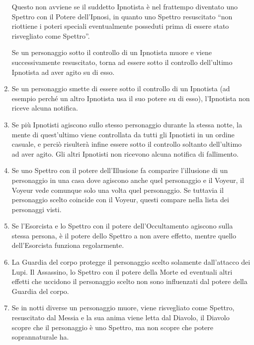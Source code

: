 \documentclass[a4paper,10pt]{article}
\begin{document}
\begin{enumerate}
Questo non avviene se il suddetto Ipnotista è nel frattempo diventato uno Spettro con il Potere dell'Ipnosi, in quanto uno Spettro resuscitato ``non riottiene i poteri speciali eventualmente posseduti prima di essere stato risvegliato come Spettro''.
 
 Se un personaggio sotto il controllo di un Ipnotista muore e viene successivamente resuscitato, torna ad essere sotto il controllo dell'ultimo Ipnotista ad aver agito su di esso.
 
 \vspace{-4 mm}
 \item Se un personaggio smette di essere sotto il controllo di un Ipnotista (ad esempio perché un altro Ipnotista usa il suo potere su di esso), l'Ipnotista non riceve alcuna notifica.
 
 \item Se più Ipnotisti agiscono sullo stesso personaggio durante la stessa notte, la mente di quest'ultimo viene controllata da tutti gli Ipnotisti in un ordine casuale, e perciò risulterà infine essere sotto il controllo soltanto dell'ultimo ad aver agito. Gli altri Ipnotisti non ricevono alcuna notifica di fallimento.
 
 \item Se uno Spettro con il potere dell'Illusione fa comparire l'illusione di un personaggio in una casa dove agiscono anche quel personaggio e il Voyeur, il Voyeur vede comunque solo una volta quel personaggio. Se tuttavia il personaggio scelto coincide con il Voyeur, questi compare nella lista dei personaggi visti.

 \item Se l'Esorcista e lo Spettro con il potere dell'Occultamento agiscono sulla stessa persona, è il potere dello Spettro a non avere effetto, mentre quello dell'Esorcista funziona regolarmente.
 
 \item La Guardia del corpo protegge il personaggio scelto solamente dall'attacco dei Lupi. Il Assassino, lo Spettro con il potere della Morte ed eventuali altri effetti che uccidono il personaggio scelto non sono influenzati dal potere della Guardia del corpo.
 
 \item Se in notti diverse un personaggio muore, viene risvegliato come Spettro, resuscitato dal Messia e la sua anima viene letta dal Diavolo, il Diavolo scopre che il personaggio è uno Spettro, ma non scopre che potere soprannaturale ha.
 

\end{enumerate}
\end{document}
